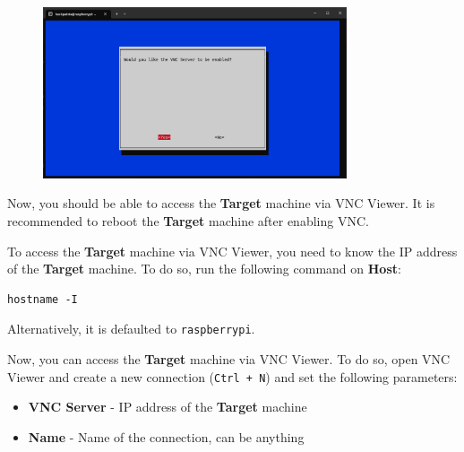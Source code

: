 \begin{figure}[H]
      \centering
      \includegraphics[width=0.8\textwidth]{texs/chapter1/image/vnc3.png}
\end{figure}

Now, you should be able to access the \textbf{Target} machine via VNC Viewer. It is recommended to reboot the \textbf{Target} machine after enabling VNC.

To access the \textbf{Target} machine via VNC Viewer, you need to know the IP address of the \textbf{Target} machine. To do so, run the following command on \textbf{Host}:

\begin{lstlisting}
hostname -I
\end{lstlisting}

Alternatively, it is defaulted to \texttt{raspberrypi}.

Now, you can access the \textbf{Target} machine via VNC Viewer. To do so, open VNC Viewer and create a new connection (\texttt{Ctrl + N}) and set the following parameters:

\begin{itemize}
      \item \textbf{VNC Server} - IP address of the \textbf{Target} machine
      \item \textbf{Name} - Name of the connection, can be anything
\end{itemize}

